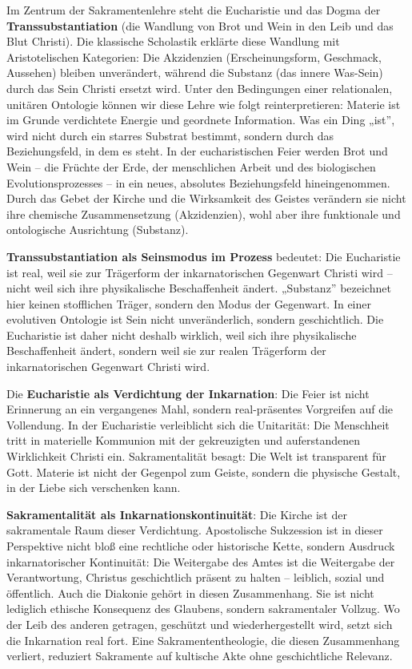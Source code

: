 \documentclass[
  ngerman,
]{article}
\begin{document}
Im Zentrum der Sakramentenlehre steht die Eucharistie und das Dogma der
\textbf{Transsubstantiation} (die Wandlung von Brot und Wein in den Leib
und das Blut Christi). Die klassische Scholastik erklärte diese Wandlung
mit Aristotelischen Kategorien: Die Akzidenzien (Erscheinungsform,
Geschmack, Aussehen) bleiben unverändert, während die Substanz (das
innere Was-Sein) durch das Sein Christi ersetzt wird. Unter den
Bedingungen einer relationalen, unitären Ontologie können wir diese
Lehre wie folgt reinterpretieren: Materie ist im Grunde verdichtete
Energie und geordnete Information. Was ein Ding „ist'', wird nicht durch
ein starres Substrat bestimmt, sondern durch das Beziehungsfeld, in dem
es steht. In der eucharistischen Feier werden Brot und Wein -- die
Früchte der Erde, der menschlichen Arbeit und des biologischen
Evolutionsprozesses -- in ein neues, absolutes Beziehungsfeld
hineingenommen. Durch das Gebet der Kirche und die Wirksamkeit des
Geistes verändern sie nicht ihre chemische Zusammensetzung
(Akzidenzien), wohl aber ihre funktionale und ontologische Ausrichtung
(Substanz).

\textbf{Transsubstantiation als Seinsmodus im Prozess} bedeutet: Die
Eucharistie ist real, weil sie zur Trägerform der inkarnatorischen
Gegenwart Christi wird -- nicht weil sich ihre physikalische
Beschaffenheit ändert. „Substanz'' bezeichnet hier keinen stofflichen
Träger, sondern den Modus der Gegenwart. In einer evolutiven Ontologie
ist Sein nicht unveränderlich, sondern geschichtlich. Die Eucharistie
ist daher nicht deshalb wirklich, weil sich ihre physikalische
Beschaffenheit ändert, sondern weil sie zur realen Trägerform der
inkarnatorischen Gegenwart Christi wird.

Die \textbf{Eucharistie als Verdichtung der Inkarnation}: Die Feier ist
nicht Erinnerung an ein vergangenes Mahl, sondern real-präsentes
Vorgreifen auf die Vollendung. In der Eucharistie verleiblicht sich die
Unitarität: Die Menschheit tritt in materielle Kommunion mit der
gekreuzigten und auferstandenen Wirklichkeit Christi ein.
Sakramentalität besagt: Die Welt ist transparent für Gott. Materie ist
nicht der Gegenpol zum Geiste, sondern die physische Gestalt, in der
Liebe sich verschenken kann.

\textbf{Sakramentalität als Inkarnationskontinuität}: Die Kirche ist der
sakramentale Raum dieser Verdichtung. Apostolische Sukzession ist in
dieser Perspektive nicht bloß eine rechtliche oder historische Kette,
sondern Ausdruck inkarnatorischer Kontinuität: Die Weitergabe des Amtes
ist die Weitergabe der Verantwortung, Christus geschichtlich präsent zu
halten -- leiblich, sozial und öffentlich. Auch die Diakonie gehört in
diesen Zusammenhang. Sie ist nicht lediglich ethische Konsequenz des
Glaubens, sondern sakramentaler Vollzug. Wo der Leib des anderen
getragen, geschützt und wiederhergestellt wird, setzt sich die
Inkarnation real fort. Eine Sakramententheologie, die diesen
Zusammenhang verliert, reduziert Sakramente auf kultische Akte ohne
geschichtliche Relevanz.
\end{document}
